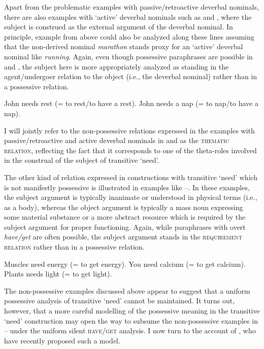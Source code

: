 \documentclass[output=paper,colorlinks,citecolor=brown]{langscibook}
\begin{document}
\noindent Apart from the problematic examples with passive/retroactive deverbal nominals, there are also examples with `active' deverbal nominals such as  and , where the subject is construed as the external argument of the deverbal nominal. In principle,  example  from above could also be analyzed along these lines assuming that the non-derived nominal \textit{marathon} stands proxy for an `active' deverbal nominal like \textit{running}. Again, even though possessive paraphrases are possible in  and , the subject here is more appropriately analyzed as standing in the agent/undergoer relation to the object (i.e., the deverbal nominal) rather than in a possessive relation.

\ea\label{active}
\ea John needs rest (= to rest/to have a rest).\label{need-rest}
\ex  John needs a nap (= to nap/to have a nap).\label{need-nap}
\z\z

\noindent I will jointly refer to the non-possessive relations expressed in the examples with passive/retroactive and active deverbal nominals in  and  as the \textsc{thematic relation}, reflecting the fact that it corresponds to one of the theta-roles involved in the construal of the subject of transitive `need'.

The other kind of relation expressed in constructions with transitive `need' which is not manifestly possessive is illustrated in examples like --. In these examples, the subject argument is typically inanimate or understood in physical terms (i.e., as a body), whereas the object argument is typically a mass noun expressing some material substance or a more abstract resource which is required by the subject argument for proper functioning. Again, while paraphrases with overt \textit{have/get} are often possible, the subject argument stands in the \textsc{requirement relation} rather than in a possessive relation.

    \largerpage[-1] %

\ea\label{requirement}
\ea Muscles need energy (= to get energy).\label{need-energy}
\ex You need calcium (= to get calcium).\label{need-calcium}
\ex Plants needs light (= to get light).\label{need-light}
\z\z

\noindent The non-possessive examples discussed above appear to suggest that a uniform possessive analysis of transitive `need' cannot be maintained. It turns out, however, that a more careful modelling of the possessive meaning in the transitive `need' construction may open the way to subsume the non-possessive examples in -- under the uniform silent \textsc{have/get} analysis. I now turn to the account of \citet{Zaroukian.Beller2013}, who have recently proposed such a model.
\end{document}
